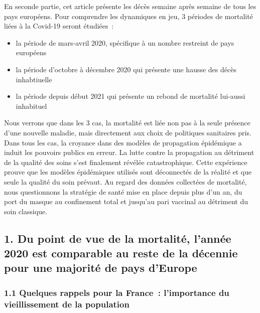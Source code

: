 \documentclass[
]{article}
\begin{document}
En seconde partie, cet article présente les décès semaine après semaine
de tous les pays européens. Pour comprendre les dynamiques en jeu, 3
périodes de mortalité liées à la Covid-19 seront étudiées~:

\begin{itemize}
\item
  la période de mars-avril 2020, spécifique à un nombre restreint de
  pays européens
\item
  la période d'octobre à décembre 2020 qui présente une hausse des décès
  inhabtiuelle
\item
  la période depuis début 2021 qui présente un rebond de mortalité
  lui-aussi inhabituel
\end{itemize}

Nous verrons que dans les 3 cas, la mortalité est liée non pas à la
seule présence d'une nouvelle maladie, mais directement aux choix de
politiques sanitaires pris. Dans tous les cas, la croyance dans des
modèles de propagation épidémique a induit les pouvoirs publics en
erreur. La lutte contre la propagation au détriment de la qualité des
soins s'est finalement révélée catastrophique. Cette expérience prouve
que les modèles épidémiques utilisés sont déconnectés de la réalité et
que seule la qualité du soin prévaut. Au regard des données collectées
de mortalité, nous questionnons la stratégie de santé mise en place
depuis plus d'un an, du port du masque au confinement total et jusqu'au
pari vaccinal au détriment du soin classique.

\hypertarget{du-point-de-vue-de-la-mortalituxe9-lannuxe9e-2020-est-comparable-au-reste-de-la-duxe9cennie-pour-une-majorituxe9-de-pays-deurope}{%
\subsection{1. Du point de vue de la mortalité, l'année 2020 est
comparable au reste de la décennie pour une majorité de pays
d'Europe}\label{du-point-de-vue-de-la-mortalituxe9-lannuxe9e-2020-est-comparable-au-reste-de-la-duxe9cennie-pour-une-majorituxe9-de-pays-deurope}}

\hypertarget{quelques-rappels-pour-la-france-limportance-du-vieillissement-de-la-population}{%
\subsubsection{1.1 Quelques rappels pour la France~: l'importance du
vieillissement de la
population}\label{quelques-rappels-pour-la-france-limportance-du-vieillissement-de-la-population}}
\end{document}
